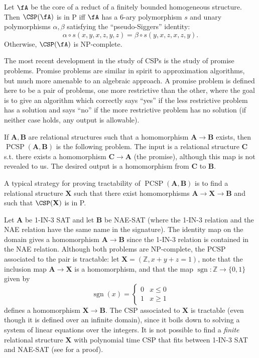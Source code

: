 \begin{conj} Let $\fA$ be the core of a reduct of a finitely bounded homogeneous structure. Then $\CSP(\fA)$ is in P iff $\fA$ has a 6-ary polymorphism $s$ and unary polymorphisms $\alpha, \beta$ satisfying the ``pseudo-Siggers'' identity:
\[
\alpha\circ s(x,y,x,z,y,z) = \beta\circ s(y,x,z,x,z,y).
\]
Otherwise, $\CSP(\fA)$ is NP-complete.
\end{conj}

The most recent development in the study of CSPs is the study of promise problems. Promise problems are similar in spirit to approximation algorithms, but much more amenable to an algebraic approach. A promise problem is defined here to be a pair of problems, one more restrictive than the other, where the goal is to give an algorithm which correctly says ``yes'' if the less restrictive problem has a solution and says ``no'' if the more restrictive problem has no solution (if neither case holds, any output is allowable).

\begin{defn} If $\mathbf{A}, \mathbf{B}$ are relational structures such that a homomorphism $\mathbf{A} \rightarrow \mathbf{B}$ exists, then $\operatorname{PCSP}(\mathbf{A},\mathbf{B})$ is the following problem. The input is a relational structure $\mathbf{C}$ s.t. there exists a homomorphism $\mathbf{C} \rightarrow \mathbf{A}$ (the promise), although this map is not revealed to us. The desired output is a homomorphism from $\mathbf{C}$ to $\mathbf{B}$.
\end{defn}

A typical strategy for proving tractability of $\operatorname{PCSP}(\mathbf{A},\mathbf{B})$ is to find a relational structure $\mathbf{X}$ such that there exist homomorphisms $\mathbf{A} \rightarrow \mathbf{X} \rightarrow \mathbf{B}$ and such that $\CSP(\mathbf{X})$ is in P.

\begin{ex} Let $\mathbf{A}$ be 1-IN-3 SAT and let $\mathbf{B}$ be NAE-SAT (where the 1-IN-3 relation and the NAE relation have the same name in the signature). The identity map on the domain gives a homomorphism $\mathbf{A} \rightarrow \mathbf{B}$ since the 1-IN-3 relation is contained in the NAE relation. Although both problems are NP-complete, the PCSP associated to the pair is tractable: let $\mathbf{X} = (\mathbb{Z}, x+y+z=1)$, note that the inclusion map $\mathbf{A} \rightarrow \mathbf{X}$ is a homomorphism, and that the map $\operatorname{sgn}: \mathbb{Z} \rightarrow \{0,1\}$ given by
\[
\operatorname{sgn}(x) = \begin{cases} 0 & x \le 0\\ 1 & x \ge 1\end{cases}
\]
defines a homomorphism $\mathbf{X} \rightarrow \mathbf{B}$. The CSP associated to $\mathbf{X}$ is tractable (even though it is defined over an infinite domain), since it boils down to solving a system of linear equations over the integers. It is not possible to find a \emph{finite} relational structure $\mathbf{X}$ with polynomial time CSP that fits between 1-IN-3 SAT and NAE-SAT (see \cite{pcsp-coloring-full} for a proof).
\end{ex}

